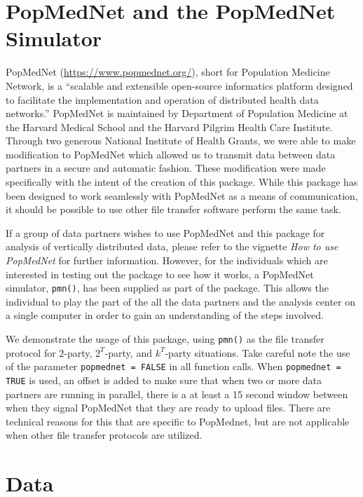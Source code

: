 \documentclass[12]{article}
\begin{document}
\section{PopMedNet and the PopMedNet Simulator}

PopMedNet (\url{https://www.popmednet.org/}), short for Population Medicine Network, is a ``scalable and extensible open-source informatics platform designed to facilitate the implementation and operation of distributed health data networks.''  PopMedNet is maintained by Department of Population Medicine at the Harvard Medical School and the Harvard Pilgrim Health Care Institute.  Through two generous National Institute of Health Grants, we were able to make modification to PopMedNet which allowed us to transmit data between data partners in a secure and automatic fashion.  These modification were made specifically with the intent of the creation of this package.  While this package has been designed to work seamlessly with PopMedNet as a means of communication, it should be possible to use other file transfer software perform the same task.

If a group of data partners wishes to use PopMedNet and this package for analysis of vertically distributed data, please refer to the vignette \emph{How to use PopMedNet} for further information.  However, for the individuals which are interested in testing out the package to see how it works, a PopMedNet simulator, \verb"pmn()", has been supplied as part of the package.  This allows the individual to play the part of the all the data partners and the analysis center on a single computer in order to gain an understanding of the steps involved.

We demonstrate the usage of this package, using \verb"pmn()" as the file transfer protocol for $2$-party, $2^T$-party, and $k^T$-party situations.  Take careful note the use of the parameter \verb"popmednet = FALSE" in all function calls.  When \verb"popmednet = TRUE" is used, an offset is added to make sure that when two or more data partners are running in parallel, there is a at least a 15 second window between when they signal PopMedNet that they are ready to upload files.  There are technical reasons for this that are specific to PopMednet, but are not applicable when other file transfer protocols are utilized.

\section{Data}
\end{document}
